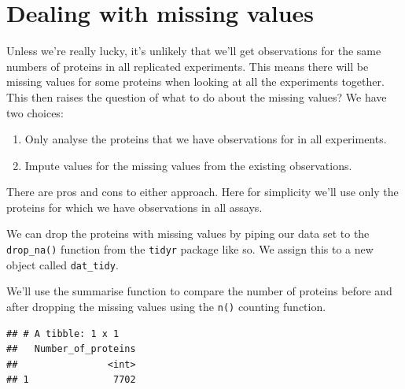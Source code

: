 \documentclass[12pt,]{book}
\newenvironment{Shaded}{\begin{snugshade}}{\end{snugshade}}
\newcommand{\KeywordTok}[1]{\textcolor[rgb]{0.13,0.29,0.53}{\textbf{#1}}}
\newcommand{\DataTypeTok}[1]{\textcolor[rgb]{0.13,0.29,0.53}{#1}}
\newcommand{\StringTok}[1]{\textcolor[rgb]{0.31,0.60,0.02}{#1}}
\newcommand{\CommentTok}[1]{\textcolor[rgb]{0.56,0.35,0.01}{\textit{#1}}}
\newcommand{\OperatorTok}[1]{\textcolor[rgb]{0.81,0.36,0.00}{\textbf{#1}}}
\newcommand{\NormalTok}[1]{#1}
\providecommand{\tightlist}{%
  \setlength{\itemsep}{0pt}\setlength{\parskip}{0pt}}
\theoremstyle{definition}
\theoremstyle{definition}
\theoremstyle{definition}
\theoremstyle{remark}
\begin{document}
\section{Dealing with missing values}\label{missing-values}

Unless we're really lucky, it's unlikely that we'll get observations for
the same numbers of proteins in all replicated experiments. This means
there will be missing values for some proteins when looking at all the
experiments together. This then raises the question of what to do about
the missing values? We have two choices:

\begin{enumerate}
\def\labelenumi{\arabic{enumi}.}
\tightlist
\item
  Only analyse the proteins that we have observations for in all
  experiments.
\item
  Impute values for the missing values from the existing observations.
\end{enumerate}

There are pros and cons to either approach. Here for simplicity we'll
use only the proteins for which we have observations in all assays.

We can drop the proteins with missing values by piping our data set to
the \texttt{drop\_na()} function from the \texttt{tidyr} package like
so. We assign this to a new object called \texttt{dat\_tidy}.

We'll use the summarise function to compare the number of proteins
before and after dropping the missing values using the \texttt{n()}
counting function.

\begin{Shaded}
\end{Shaded}

\begin{verbatim}
## # A tibble: 1 x 1
##   Number_of_proteins
##                <int>
## 1               7702
\end{verbatim}

\begin{Shaded}
\end{Shaded}
\end{document}
